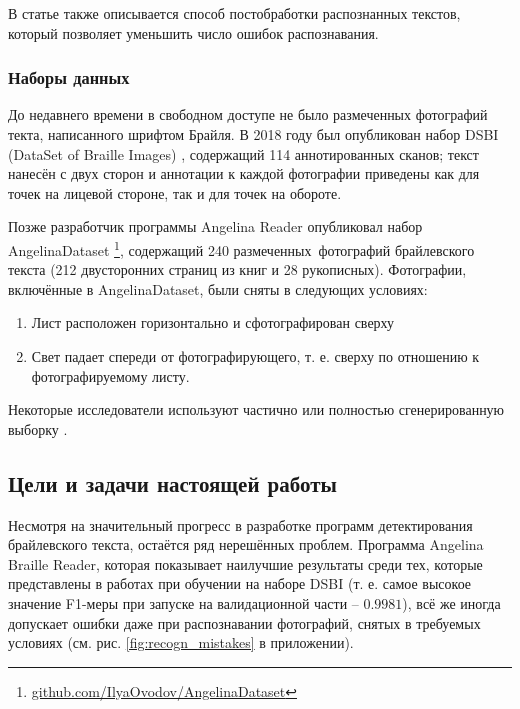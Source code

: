 \documentclass{main.tex}[subfiles]
\begin{document}
В статье \cite{ortoncelli2021} также описывается способ постобработки распознанных текстов, который позволяет уменьшить число ошибок распознавания.

\subsubsection{Наборы данных}\label{section:datas}

До недавнего времени в свободном доступе не было размеченных фотографий текта, написанного шрифтом Брайля.
В 2018 году был опубликован набор DSBI (DataSet of Braille Images) \cite{li2018dsbi}, содержащий 114 аннотированных сканов; текст нанесён с двух сторон и аннотации к каждой фотографии приведены как для точек на лицевой стороне, так и для точек на обороте.

Позже разработчик программы Angelina Reader опубликовал набор An\-ge\-li\-na\-Da\-ta\-set \footnote{\href{https://github.com/IlyaOvodov/AngelinaDataset}{github.com/IlyaOvodov/AngelinaDataset}}, содержащий 240 размеченных фотографий брайлевского текста (212 двусторонних страниц из книг и 28 рукописных).
Фотографии, включённые в AngelinaDataset, были сняты в следующих условиях:
\begin{enumerate}[noitemsep]
	\item Лист расположен горизонтально и сфотографирован сверху
	\item Свет падает спереди от фотографирующего, т. е. сверху по отношению к фотографируемому листу.
\end{enumerate}

Некоторые исследователи используют частично или полностью сгенерированную выборку \cite{baumgartner2020app, ortoncelli2021}.

\subsection{Цели и задачи настоящей работы}

Несмотря на значительный прогресс в разработке программ детектирования брайлевского текста, остаётся ряд нерешённых проблем.
Программа Angelina Braille Reader, которая показывает наилучшие результаты среди тех, которые представлены в работах \cite{li2018dsbi, li2020braunet, ovodov2020} при обучении на наборе DSBI (т. е. самое высокое значение F1-меры при запуске на валидационной части -- $0.9981$), всё же иногда допускает ошибки даже при распознавании фотографий, снятых в требуемых условиях (см. рис. \ref{fig:recogn_mistakes} в приложении).
\end{document}
